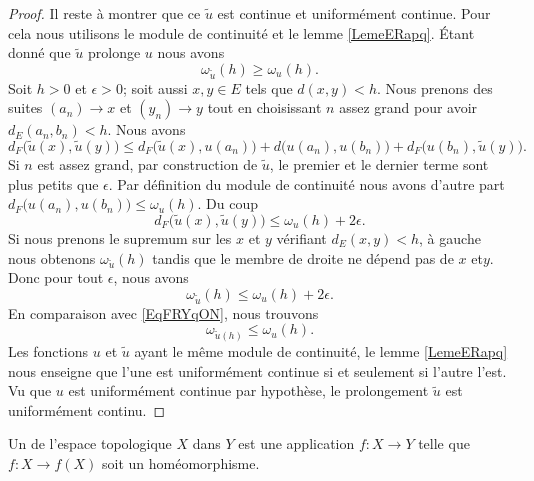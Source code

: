 \begin{proof}
    Il reste à montrer que ce \( \tilde u\) est continue et uniformément continue. Pour cela nous utilisons le module de continuité et le lemme \ref{LemeERapq}. Étant donné que \( \tilde u\) prolonge \( u\) nous avons 
    \begin{equation}        \label{EqFRYqON}
        \omega_{\tilde u}(h)\geq \omega_u(h).
    \end{equation}
    Soit \( h>0\) et \( \epsilon>0\); soit aussi \( x,y\in E\) tels que \( d(x,y)<h\). Nous prenons des suites \( (a_n)\to x\) et \( (y_n)\to y\) tout en choisissant \( n\) assez grand pour avoir \( d_E(a_n,b_n)<h\). Nous avons
    \begin{equation}
        d_F\big( \tilde u(x),\tilde u(y) \big)\leq d_F\big( \tilde u(x),u(a_n) \big)+d\big( u(a_n),u(b_n) \big)+d_F\big( u(b_n),\tilde u(y) \big).
    \end{equation}
    Si \( n\) est assez grand, par construction de \( \tilde u\), le premier et le dernier terme sont plus petits que \( \epsilon\). Par définition du module de continuité nous avons d'autre part \( d_F\big( u(a_n),u(b_n) \big)\leq \omega_u(h)\). Du coup
    \begin{equation}
        d_F\big( \tilde u(x),\tilde u(y) \big)\leq \omega_u(h)+2\epsilon.
    \end{equation}
    Si nous prenons le supremum sur les \( x\) et \( y\) vérifiant \( d_E(x,y)<h\), à gauche nous obtenons \( \omega_{\tilde u}(h)\) tandis que le membre de droite ne dépend pas de \( x\) et\( y\). Donc pour tout \( \epsilon\), nous avons
    \begin{equation}
        \omega_{\tilde u}(h)\leq \omega_u(h)+2\epsilon.
    \end{equation}
    En comparaison avec \eqref{EqFRYqON}, nous trouvons
    \begin{equation}
        \omega_{\tilde u(h)}\leq \omega_u(h).
    \end{equation}
    Les fonctions \( u\) et \( \tilde u\) ayant le même module de continuité, le lemme \ref{LemeERapq} nous enseigne que l'une est uniformément continue si et seulement si l'autre l'est. Vu que \( u\) est uniformément continue par hypothèse, le prolongement \( \tilde u\) est uniformément continu.
\end{proof}

\begin{definition}
    Un  de l'espace topologique \( X\) dans \( Y\) est une application \( f\colon X\to Y\) telle que \( f\colon X\to f(X)\) soit un homéomorphisme.
\end{definition}

